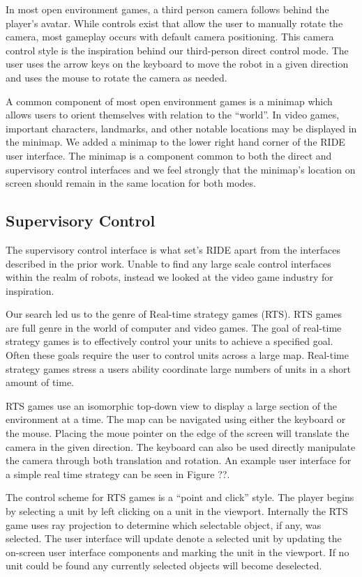 In most open environment games, a third person camera follows behind the player's avatar. While controls exist that allow the user to manually rotate the camera, most gameplay occurs with default camera positioning. This camera control style is the inspiration behind our third-person direct control mode. The user uses the arrow keys on the keyboard to move the robot in a given direction and uses the mouse to rotate the camera as needed.

A common component of most open environment games is a minimap which allows users to orient themselves with relation to the ``world''. In video games, important characters, landmarks, and other notable locations may be displayed in the minimap. We added a minimap to the lower right hand corner of the RIDE user interface. The minimap is a component common to both the direct and supervisory control interfaces and we feel strongly that the minimap's location on screen should remain in the same location for both modes.

\subsection{Supervisory Control}

The supervisory control interface is what set's RIDE apart from the interfaces described in the prior work. Unable to find any large scale control interfaces within the realm of robots, instead we looked at the video game industry for inspiration.

Our search led us to the genre of Real-time strategy games (RTS). RTS games are full genre in the world of computer and video games. The goal of real-time strategy games is to effectively control your units to achieve a specified goal. Often these goals require the user to control units across a large  map. Real-time strategy games stress a users ability coordinate large numbers of units in a short amount of time. 

RTS games use an isomorphic top-down view to display a large section of the environment at a time. The map can be navigated using either the keyboard or the mouse. Placing the moue pointer on the edge of the screen will translate the camera in the given direction. The keyboard can also be used directly manipulate the camera through both translation and rotation. An example user interface for a simple real time strategy can be seen in Figure ??. 

The control scheme for RTS games is a ``point and click'' style. The player begins by selecting a unit by left clicking on a unit in the viewport. Internally the RTS game uses ray projection to determine which selectable object, if any, was selected. The user interface will update denote a selected unit by updating the on-screen user interface components and marking the unit in the viewport. If no unit could be found any currently selected objects will become deselected.

